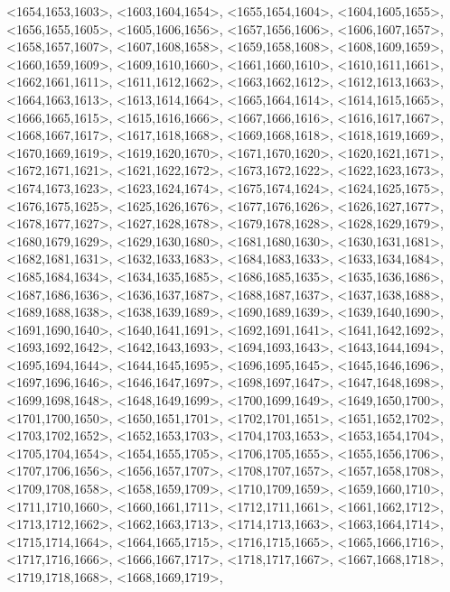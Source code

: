 \documentclass[a4paper,10pt]{article}
\begin{document}
\begin{eulernotebook}
\begin{euleroutput}
  <1654,1653,1603>,
  <1603,1604,1654>,
  <1655,1654,1604>,
  <1604,1605,1655>,
  <1656,1655,1605>,
  <1605,1606,1656>,
  <1657,1656,1606>,
  <1606,1607,1657>,
  <1658,1657,1607>,
  <1607,1608,1658>,
  <1659,1658,1608>,
  <1608,1609,1659>,
  <1660,1659,1609>,
  <1609,1610,1660>,
  <1661,1660,1610>,
  <1610,1611,1661>,
  <1662,1661,1611>,
  <1611,1612,1662>,
  <1663,1662,1612>,
  <1612,1613,1663>,
  <1664,1663,1613>,
  <1613,1614,1664>,
  <1665,1664,1614>,
  <1614,1615,1665>,
  <1666,1665,1615>,
  <1615,1616,1666>,
  <1667,1666,1616>,
  <1616,1617,1667>,
  <1668,1667,1617>,
  <1617,1618,1668>,
  <1669,1668,1618>,
  <1618,1619,1669>,
  <1670,1669,1619>,
  <1619,1620,1670>,
  <1671,1670,1620>,
  <1620,1621,1671>,
  <1672,1671,1621>,
  <1621,1622,1672>,
  <1673,1672,1622>,
  <1622,1623,1673>,
  <1674,1673,1623>,
  <1623,1624,1674>,
  <1675,1674,1624>,
  <1624,1625,1675>,
  <1676,1675,1625>,
  <1625,1626,1676>,
  <1677,1676,1626>,
  <1626,1627,1677>,
  <1678,1677,1627>,
  <1627,1628,1678>,
  <1679,1678,1628>,
  <1628,1629,1679>,
  <1680,1679,1629>,
  <1629,1630,1680>,
  <1681,1680,1630>,
  <1630,1631,1681>,
  <1682,1681,1631>,
  <1632,1633,1683>,
  <1684,1683,1633>,
  <1633,1634,1684>,
  <1685,1684,1634>,
  <1634,1635,1685>,
  <1686,1685,1635>,
  <1635,1636,1686>,
  <1687,1686,1636>,
  <1636,1637,1687>,
  <1688,1687,1637>,
  <1637,1638,1688>,
  <1689,1688,1638>,
  <1638,1639,1689>,
  <1690,1689,1639>,
  <1639,1640,1690>,
  <1691,1690,1640>,
  <1640,1641,1691>,
  <1692,1691,1641>,
  <1641,1642,1692>,
  <1693,1692,1642>,
  <1642,1643,1693>,
  <1694,1693,1643>,
  <1643,1644,1694>,
  <1695,1694,1644>,
  <1644,1645,1695>,
  <1696,1695,1645>,
  <1645,1646,1696>,
  <1697,1696,1646>,
  <1646,1647,1697>,
  <1698,1697,1647>,
  <1647,1648,1698>,
  <1699,1698,1648>,
  <1648,1649,1699>,
  <1700,1699,1649>,
  <1649,1650,1700>,
  <1701,1700,1650>,
  <1650,1651,1701>,
  <1702,1701,1651>,
  <1651,1652,1702>,
  <1703,1702,1652>,
  <1652,1653,1703>,
  <1704,1703,1653>,
  <1653,1654,1704>,
  <1705,1704,1654>,
  <1654,1655,1705>,
  <1706,1705,1655>,
  <1655,1656,1706>,
  <1707,1706,1656>,
  <1656,1657,1707>,
  <1708,1707,1657>,
  <1657,1658,1708>,
  <1709,1708,1658>,
  <1658,1659,1709>,
  <1710,1709,1659>,
  <1659,1660,1710>,
  <1711,1710,1660>,
  <1660,1661,1711>,
  <1712,1711,1661>,
  <1661,1662,1712>,
  <1713,1712,1662>,
  <1662,1663,1713>,
  <1714,1713,1663>,
  <1663,1664,1714>,
  <1715,1714,1664>,
  <1664,1665,1715>,
  <1716,1715,1665>,
  <1665,1666,1716>,
  <1717,1716,1666>,
  <1666,1667,1717>,
  <1718,1717,1667>,
  <1667,1668,1718>,
  <1719,1718,1668>,
  <1668,1669,1719>,

\end{euleroutput}
\end{eulernotebook}
\end{document}

